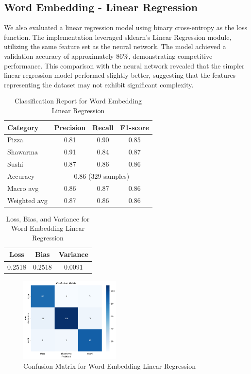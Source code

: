 \subsection{Word Embedding - Linear Regression}
We also evaluated a linear regression model using binary cross-entropy as the loss function. The implementation leveraged sklearn's Linear Regression module, utilizing the same feature set as the neural network. The model achieved a validation accuracy of approximately 86\%, demonstrating competitive performance. This comparison with the neural network revealed that the simpler linear regression model performed slightly better, suggesting that the features representing the dataset may not exhibit significant complexity.

\begin{table}[h]
    \centering
    \begin{tabular}{lccc}
        \hline
        Category     & Precision                              & Recall & F1-score \\
        \hline
        Pizza        & 0.81                                   & 0.90   & 0.85     \\
        Shawarma     & 0.91                                   & 0.84   & 0.87     \\
        Sushi        & 0.87                                   & 0.86   & 0.86     \\
        \hline
        Accuracy     & \multicolumn{3}{c}{0.86 (329 samples)}                     \\
        Macro avg    & 0.86                                   & 0.87   & 0.86     \\
        Weighted avg & 0.87                                   & 0.86   & 0.86     \\
        \hline
    \end{tabular}
    \caption{Classification Report for Word Embedding Linear Regression}
\end{table}

\begin{table}[h]
    \centering
    \begin{tabular}{ccc}
        \hline
        Loss   & Bias   & Variance \\
        \hline
        0.2518 & 0.2518 & 0.0091   \\
        \hline
    \end{tabular}
    \caption{Loss, Bias, and Variance for Word Embedding Linear Regression}
\end{table}

\begin{figure}[h]
    \centering
    \includegraphics[width=0.45\textwidth]{params/linearregression_confusion.png}
    \caption{Confusion Matrix for Word Embedding Linear Regression}
\end{figure}